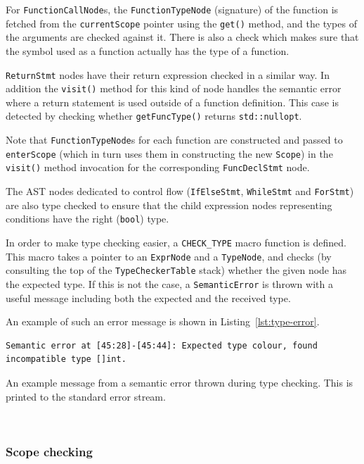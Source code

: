 \documentclass[11pt,a4paper]{scrartcl}
\begin{document}
For \verb|FunctionCallNode|s, the \verb|FunctionTypeNode| (signature) of the function is fetched from the \verb|currentScope| pointer using the \verb|get()| method, and the types of the arguments are checked against it. There is also a check which makes sure that the symbol used as a function actually has the type of a function.

\verb|ReturnStmt| nodes have their return expression checked in a similar way. In addition the \verb|visit()| method for this kind of node handles the semantic error where a return statement is used outside of a function definition. This case is detected by checking whether \verb|getFuncType()| returns \verb|std::nullopt|.

Note that \verb|FunctionTypeNode|s for each function are constructed and passed to \verb|enterScope| (which in turn uses them in constructing the new \verb|Scope|) in the \verb|visit()| method invocation for the corresponding \verb|FuncDeclStmt| node.

The AST nodes dedicated to control flow (\verb|IfElseStmt|, \verb|WhileStmt| and \verb|ForStmt|) are also type checked to ensure that the child expression nodes representing conditions have the right (\verb|bool|) type.

In order to make type checking easier, a \verb|CHECK_TYPE| macro function is defined. This macro takes a pointer to an \verb|ExprNode| and a \verb|TypeNode|, and checks (by consulting the top of the \verb|TypeCheckerTable| stack) whether the given node has the expected type. If this is not the case, a \verb|SemanticError| is thrown with a useful message including both the expected and the received type.

An example of such an error message is shown in Listing~\ref{lst:type-error}.

\begin{lstfloat}

\begin{verbatim}
Semantic error at [45:28]-[45:44]: Expected type colour, found incompatible type []int.
\end{verbatim}

  \caption{An example message from a semantic error thrown during type checking. This is printed to the standard error stream.}~\label{lst:type-error}
\end{lstfloat}

\subsubsection{Scope checking}
\end{document}
